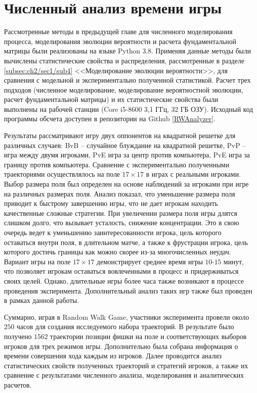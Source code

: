 \chapter{Численный анализ времени игры}\label{ch:ch3}

Рассмотренные методы в предыдущей главе для численного моделирования процесса,
моделирования эволюции вероятности и расчета фундаментальной матрицы 
были реализованы на языке Python 3.8. 
Применяя данные методы были вычислены статистические свойства и распределения, 
рассмотренные в разделе \cref{subsec:ch2/sec1/sub4} <<Моделирование эволюции вероятности>>, для сравнения с модельной и экспериментально полученной статистикой. 
Расчет трех подходов (численное моделирование, моделирование вероятностной эволюции, расчет фундаментальной матрицы) 
и их статистические свойства были выполнены на рабочей станции (Core i5-8600 3,1 ГГц, 32 ГБ ОЗУ). 
Исходный код программы обсчета доступен в репозитории на Github \cref{RWAnalyzer}.

Результаты рассматривают игру двух оппонентов на квадратной решетке для различных случаев:
BvB -- случайное блуждание на квадратной решетке, PvP -- игра между двумя игроками, PvE игра за центр против компьютера, PvE игра за границу против компьютера. 
Сравнение с экспериментально полученными траекториями осуществлялось на поле $17 \times 17$ в играх с 
реальными игроками. Выбор размера поля был определен на основе наблюдений за игроками при игре на различных размерах поля.
Анализ показал, что уменьшение размера поля приводит к быстрому завершению игры, что не дает игрокам находить качественные сложные
стратегии. При увеличении размера поля игры длятся слишком долго, что вызывает усталость, снижение концентрации.
Это в свою очередь ведет к уменьшению заинтересованности игрока, цель которого оставаться внутри поля, в длительном матче,
а также к фрустрации игрока, цель которого достичь границы как можно скорее из-за многочисленных неудач.
Вариант игры на поле $17 \times 17$ демонстрирует среднее время игры $10$-$15$ минут, что позволяет игрокам оставаться вовлеченными
в процесс и придерживаться своих целей. Однако, длительные игры более часа также возникают в процессе проведения эксперимента.
Дополнительный анализ таких игр также был проведен в рамках данной работы.

Суммарно, играя в Random Walk Game, участники эксперимента провели около $250$ часов для создания исследуемого набора траекторий.
В результате было получено $1562$ траектории позиции фишки на поле и соответствующих выборов игроков для трех режимов игры. 
Дополнительно была собрана информация о времени совершения хода каждым из игроков. 
Далее проводится анализ статистических свойств полученных траекторий и стратегий игроков, 
а также их сравнение с результатами численного анализа, моделирования и аналитических расчетов.

